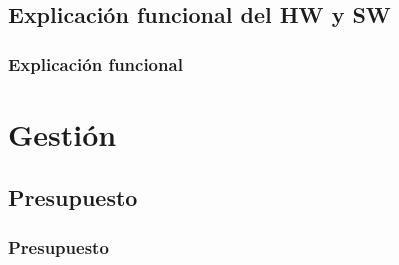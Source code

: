 \subsection{Explicación funcional del HW y SW}
\begin{frame}
	\frametitle{Explicación funcional}

\end{frame}

\section{Gestión}

\subsection{Presupuesto}
\begin{frame}
	\frametitle{Presupuesto}
	
\end{frame}